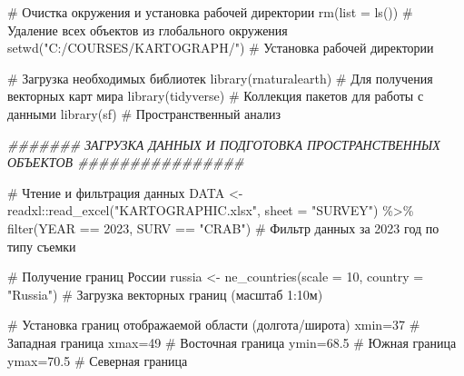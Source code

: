 \documentclass[
  letterpaper,
  DIV=11,
  numbers=noendperiod]{scrreprt}
\newenvironment{Shaded}{\begin{snugshade}}{\end{snugshade}}
\newcommand{\AttributeTok}[1]{\textcolor[rgb]{0.40,0.45,0.13}{#1}}
\newcommand{\CommentTok}[1]{\textcolor[rgb]{0.37,0.37,0.37}{#1}}
\newcommand{\DecValTok}[1]{\textcolor[rgb]{0.68,0.00,0.00}{#1}}
\newcommand{\DocumentationTok}[1]{\textcolor[rgb]{0.37,0.37,0.37}{\textit{#1}}}
\newcommand{\FloatTok}[1]{\textcolor[rgb]{0.68,0.00,0.00}{#1}}
\newcommand{\FunctionTok}[1]{\textcolor[rgb]{0.28,0.35,0.67}{#1}}
\newcommand{\NormalTok}[1]{\textcolor[rgb]{0.00,0.23,0.31}{#1}}
\newcommand{\OtherTok}[1]{\textcolor[rgb]{0.00,0.23,0.31}{#1}}
\newcommand{\SpecialCharTok}[1]{\textcolor[rgb]{0.37,0.37,0.37}{#1}}
\newcommand{\StringTok}[1]{\textcolor[rgb]{0.13,0.47,0.30}{#1}}
\begin{document}
\begin{Shaded}
\begin{Highlighting}[]
\CommentTok{\# Очистка окружения и установка рабочей директории}
\FunctionTok{rm}\NormalTok{(}\AttributeTok{list =} \FunctionTok{ls}\NormalTok{())  }\CommentTok{\# Удаление всех объектов из глобального окружения}
\FunctionTok{setwd}\NormalTok{(}\StringTok{"C:/COURSES/KARTOGRAPH/"}\NormalTok{)  }\CommentTok{\# Установка рабочей директории}

\CommentTok{\# Загрузка необходимых библиотек}
\FunctionTok{library}\NormalTok{(rnaturalearth)  }\CommentTok{\# Для получения векторных карт мира}
\FunctionTok{library}\NormalTok{(tidyverse)      }\CommentTok{\# Коллекция пакетов для работы с данными}
\FunctionTok{library}\NormalTok{(sf)             }\CommentTok{\# Пространственный анализ}

\DocumentationTok{\#\#\#\#\#\#\# ЗАГРУЗКА ДАННЫХ И ПОДГОТОВКА ПРОСТРАНСТВЕННЫХ ОБЪЕКТОВ \#\#\#\#\#\#\#\#\#\#\#\#\#\#\#\#}

\CommentTok{\# Чтение и фильтрация данных}
\NormalTok{DATA }\OtherTok{\textless{}{-}}\NormalTok{ readxl}\SpecialCharTok{::}\FunctionTok{read\_excel}\NormalTok{(}\StringTok{"KARTOGRAPHIC.xlsx"}\NormalTok{, }\AttributeTok{sheet =} \StringTok{"SURVEY"}\NormalTok{) }\SpecialCharTok{\%\textgreater{}\%} 
  \FunctionTok{filter}\NormalTok{(YEAR }\SpecialCharTok{==} \DecValTok{2023}\NormalTok{, SURV }\SpecialCharTok{==} \StringTok{"CRAB"}\NormalTok{)  }\CommentTok{\# Фильтр данных за 2023 год по типу съемки}

\CommentTok{\# Получение границ России}
\NormalTok{russia }\OtherTok{\textless{}{-}} \FunctionTok{ne\_countries}\NormalTok{(}\AttributeTok{scale =} \DecValTok{10}\NormalTok{, }\AttributeTok{country =} \StringTok{"Russia"}\NormalTok{)  }\CommentTok{\# Загрузка векторных границ (масштаб 1:10м)}

\CommentTok{\# Установка границ отображаемой области (долгота/широта)}
\NormalTok{xmin}\OtherTok{=}\DecValTok{37}  \CommentTok{\# Западная граница}
\NormalTok{xmax}\OtherTok{=}\DecValTok{49}  \CommentTok{\# Восточная граница}
\NormalTok{ymin}\OtherTok{=}\FloatTok{68.5} \CommentTok{\# Южная граница}
\NormalTok{ymax}\OtherTok{=}\FloatTok{70.5} \CommentTok{\# Северная граница}


\end{Highlighting}
\end{Shaded}
\end{document}
